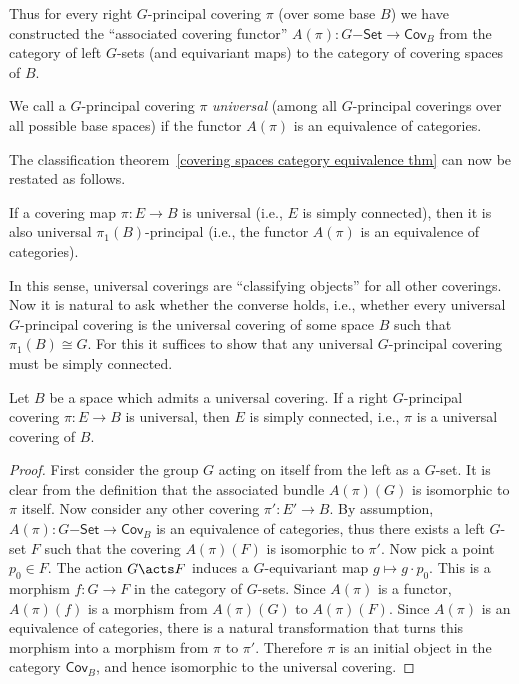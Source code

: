 Thus for every right $G$-principal covering $\pi$ (over some base $B$) we have constructed the ``associated covering functor'' $A(\pi):G\mathsf{-Set}\to \mathsf{Cov}_B$ from the category of left $G$-sets (and equivariant maps) to the category of covering spaces of $B$. 

\begin{defn}
    We call a $G$-principal covering $\pi$ \textit{universal} (among all $G$-principal coverings over all possible base spaces) if the functor $A(\pi)$ is an equivalence of categories.
\end{defn}

The classification theorem~\ref{covering spaces category equivalence thm} can now be restated as follows.
\begin{thm}
     If a covering map $\pi:E\to B$ is universal (i.e., $E$ is simply connected), then it is also universal $\pi_1(B)$-principal (i.e., the functor $A(\pi)$ is an equivalence of categories).
\end{thm}

In this sense, universal coverings are ``classifying objects'' for all other coverings. Now it is natural to ask whether the converse holds, i.e., whether every universal $G$-principal covering is the universal covering of some space $B$ such that $\pi_1(B)\cong G$. For this it suffices to show that any universal $G$-principal covering must be simply connected.

\begin{prop}
    Let $B$ be a space which admits a universal covering. If a right $G$-principal covering  $\pi:E\to B$ is universal, then $E$ is simply connected, i.e., $\pi$ is a universal covering of $B$.
\end{prop}
\begin{proof}
    First consider the group $G$ acting on itself from the left as a $G$-set. It is clear from the definition that the associated bundle $A(\pi)(G)$ is isomorphic to $\pi$ itself. Now consider any other covering $\pi':E'\to B$. By assumption, $A(\pi):G\mathsf{-Set}\to \mathsf{Cov}_B$ is an equivalence of categories, thus there exists a left $G$-set $F$ such that the covering $A(\pi)(F)$ is isomorphic to $\pi'$. Now pick a point $p_0\in F$. The action $G\acts F$ induces a $G$-equivariant map $g\mapsto g\cdot p_0$. This is a morphism $f:G\to F$ in the category of $G$-sets. Since $A(\pi)$ is a functor, $A(\pi)(f)$ is a morphism from $A(\pi)(G)$ to $A(\pi)(F)$. Since $A(\pi)$ is an equivalence of categories, there is a natural transformation that turns this morphism into a morphism from $\pi$ to $\pi'$. Therefore $\pi$ is an initial object in the category $\mathsf{Cov}_B$, and hence isomorphic to the universal covering.
\end{proof}


